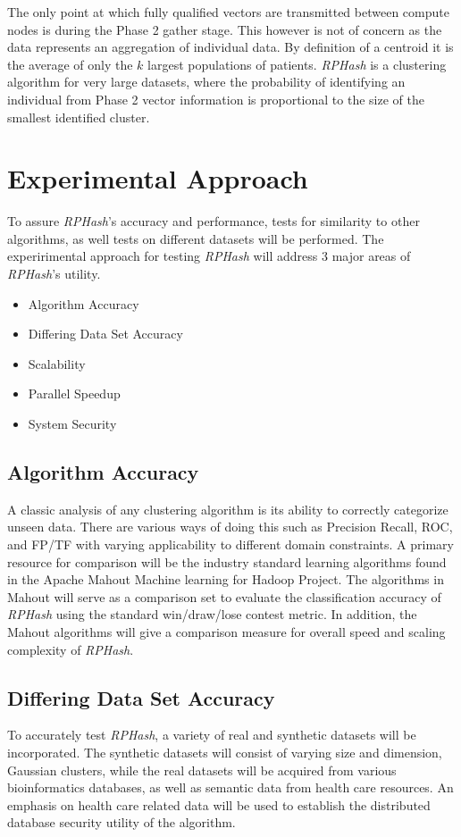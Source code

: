 \documentclass[a4paper,10pt]{article}
\begin{document}
The only point at which fully qualified vectors are transmitted between compute
nodes is during the Phase 2 gather stage.  This however is not of concern as
the data represents an aggregation of individual data.	By definition of a
centroid it is the average of only the $k$ largest populations of patients.
\emph{RPHash} is a clustering algorithm for very large datasets, where the
probability of identifying an individual from Phase 2 vector
 information is proportional to the size of the smallest identified cluster.

\section{Experimental Approach}

To assure \emph{RPHash}'s accuracy and performance, tests for similarity
to other algorithms, as well tests on different datasets will be performed.
The experirimental approach for testing \emph{RPHash} will address 3 major
areas of \emph{RPHash}'s utility.  
\begin{itemize}
 \item Algorithm Accuracy 
\item Differing Data Set Accuracy 
\item Scalability
 \item Parallel Speedup 
\item System Security

\end{itemize}


\subsection{Algorithm Accuracy} A classic analysis of any clustering algorithm
is its ability to correctly categorize unseen data.  There are various ways of
doing this such as Precision Recall, ROC, and FP/TF with varying applicability
to different domain constraints.  A primary resource for comparison will
be the industry standard learning algorithms found in the Apache Mahout
Machine learning for Hadoop Project.  The algorithms in Mahout will serve
as a comparison set to evaluate the classification accuracy of \emph{RPHash}
using the standard win/draw/lose contest metric\cite{Webb2000}.  In addition,
the Mahout algorithms will give a comparison measure for overall speed and
scaling complexity of \emph{RPHash}.

\subsection{Differing Data Set Accuracy} To accurately test \emph{RPHash},
a variety of real and synthetic datasets will be incorporated.	The synthetic
datasets will consist of varying size and dimension, Gaussian clusters, while
the real datasets will be acquired from various bioinformatics databases,
as well as semantic data from health care resources.  An emphasis on health
care related data will be used to establish the distributed database security
utility of the algorithm.
\end{document}
